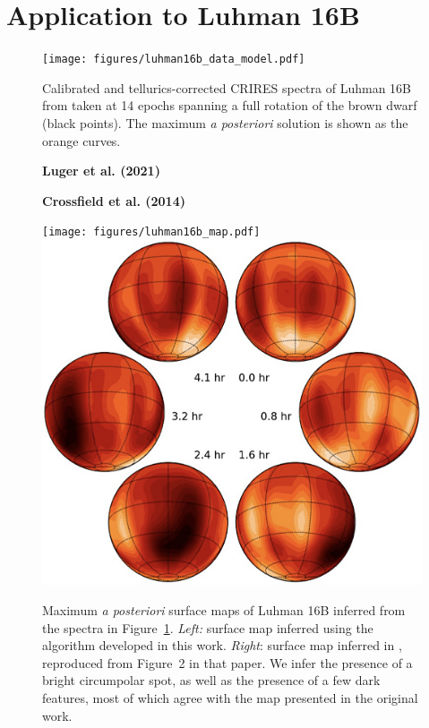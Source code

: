 \documentclass[modern]{aastex631}
\begin{document}
\section{Application to Luhman 16B}
\label{sec:luhman16b}
%
\begin{figure}[p!]
    \begin{centering}
        \texttt{[image: figures/luhman16b\_data\_model.pdf]} %
        \caption{%
            Calibrated and tellurics-corrected CRIRES spectra of Luhman 16B from \citet{Crossfield2014} taken at 14 epochs spanning a full rotation of the brown dwarf (black points). The maximum \emph{a posteriori} solution is shown as the orange curves.
        }
        \label{fig:luhman16b:data_model}
    \end{centering}
\end{figure}
%
\begin{figure}[p!]
    \begin{centering}
        \begin{minipage}[t]{0.49\linewidth}
            \centering
            \quad\quad\quad
            \textbf{Luger et al. (2021)}
        \end{minipage}
        \vspace{1em}
        \begin{minipage}[t]{0.49\linewidth}
            \centering
            \textbf{Crossfield et al. (2014)}
        \end{minipage}
        \texttt{[image: figures/luhman16b\_map.pdf]} %
        \includegraphics[width=0.462\linewidth]{static/luhman16b_crossfield.png} %
        \caption{%
            Maximum \emph{a posteriori} surface maps of Luhman 16B inferred from the spectra in Figure~\ref{fig:luhman16b:data_model}. \emph{Left:} surface map inferred using the algorithm developed in this work. \emph{Right}: surface map inferred in \citet{Crossfield2014}, reproduced from Figure~2 in that paper. We infer the presence of a bright circumpolar spot, as well as the presence of a few dark features, most of which agree with the map presented in the original work.
        }
        \label{fig:luhman16b:maps}
    \end{centering}
\end{figure}
\end{document}
